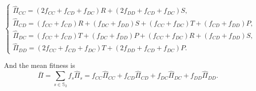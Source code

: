 \documentclass[showpacs,superscriptaddress,reprint,nofootinbib,amsmath,amssymb,aps,pre]{revtex4-1}
\begin{document}
\begin{widetext}
\begin{equation}
     \left\{
                \begin{array}{ll}
                \widehat{\Pi}_{CC}=(2f_{CC}+f_{CD}+f_{DC})R+(2f_{DD}+f_{CD}+f_{DC})S,\\ 
		\widehat{\Pi}_{CD}=(f_{CC}+f_{CD})R+(f_{DC}+f_{DD})S+(f_{CC}+f_{DC})T+(f_{CD}+f_{DD})P,\\ 
		\widehat{\Pi}_{DC}=(f_{CC}+f_{CD})T+(f_{DC}+f_{DD})P+(f_{CC}+f_{DC})R+(f_{CD}+f_{DD})S,\\ 
		\widehat{\Pi}_{DD}=(2f_{CC}+f_{CD}+f_{DC})T+(2f_{DD}+f_{CD}+f_{DC})P.
                \end{array}
        \right. 
\end{equation}

And the mean fitness is
\begin{equation}
\bar{\Pi}=\sum_{s\in\mathbb{S}_2}f_{s}\widehat{\Pi}_{s}=f_{CC}\widehat{\Pi}_{CC}+f_{CD}\widehat{\Pi}_{CD}+f_{DC}\widehat{\Pi}_{DC}+f_{DD}\widehat{\Pi}_{DD}.\label{eq:MF_meanf}
\end{equation}


\end{widetext}
\end{document}
